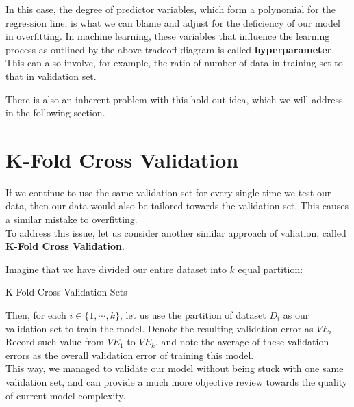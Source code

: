 In this case, the degree of predictor variables, which form a polynomial for the regression line, is what we can blame and adjust for the deficiency of our model in overfitting. 
In machine learning, these variables that influence the learning process as outlined by the above tradeoff diagram is called \textbf{hyperparameter}. This can also involve, for example, the ratio of number of data in training set to that in validation set.

There is also an inherent problem with this hold-out idea, which we will address in the following section.

\section{K-Fold Cross Validation}
If we continue to use the same validation set for every single time we test our data, then our data would also be tailored towards the validation set. This causes a similar mistake to overfitting. \\
To address this issue, let us consider another similar approach of valiation, called \textbf{K-Fold Cross Validation}.

Imagine that we have divided our entire dataset into $k$ equal partition:
\begin{ln-fig}{K-Fold Cross Validation Sets}{}
    \begin{center}
    \end{center}
\end{ln-fig}
Then, for each $i \in \{1, \cdots, k\}$, let us use the partition of dataset $D_i$ as our validation set to train the model. Denote the resulting validation error as ${VE}_i$. \\
Record such value from ${VE}_1$ to ${VE}_k$, and note the average of these validation errors as the overall validation error of training this model. \\
This way, we managed to validate our model without being stuck with one same validation set, and can provide a much more objective review towards the quality of current model complexity.

